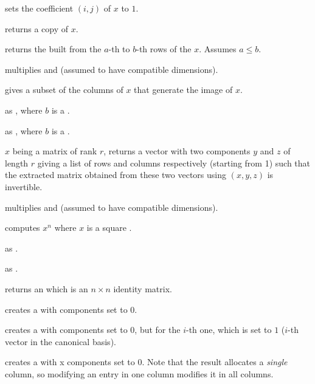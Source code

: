 sets the coefficient $(i,j)$ of $x$
to $1$.

 returns a copy of $x$.

 returns the  built
from the $a$-th to $b$-th rows of the  $x$. Assumes $a \leq b$.

 multiplies   and  (assumed
to have compatible dimensions).

 gives a subset of the columns of $x$ that generate
the image of $x$.



as , where $b$ is a .

as , where $b$ is a .


 $x$ being a matrix of rank $r$, returns a
vector with two  components $y$ and $z$ of length $r$ giving a
list of rows and columns respectively (starting from 1) such that the extracted
matrix obtained from these two vectors using $(x,y,z)$ is
invertible.

 multiplies   and  (assumed to
have compatible dimensions).

 computes $x^n$ where $x$ is a square
.

 as .

 as .

 returns an  which is an $n \times n$
identity matrix.

 creates a  with  components set to
$0$.

 creates a  with  components
set to $0$, but for the $i$-th one, which is set to $1$ ($i$-th vector in the
canonical basis).

 creates a  with  x 
components set to $0$. Note that the result allocates a
\emph{single} column, so modifying an entry in one column modifies it in
all columns.

